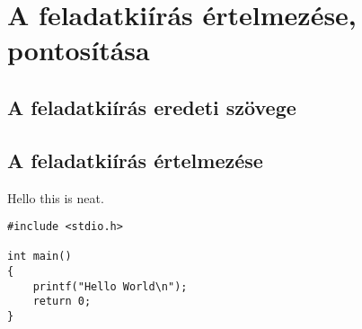 \chapter{A feladatkiírás értelmezése, pontosítása}

\section{A feladatkiírás eredeti szövege}

\section{A feladatkiírás értelmezése}

Hello this  is neat.

\begin{lstlisting}
#include <stdio.h>

int main()
{
    printf("Hello World\n");
    return 0;
}

\end{lstlisting}